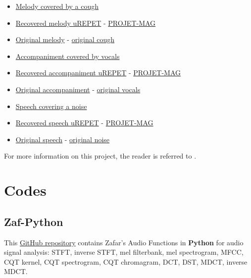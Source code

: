 \documentclass{article}
\begin{document}
\begin{itemize}[noitemsep,topsep=0pt]
\item \href{Audio/uREPET/melody&cough.wav}{Melody covered by a cough}
\item \href{Audio/uREPET/melody-cough (uREPET).wav}{Recovered melody uREPET} - \href{Audio/uREPET/melody-cough (PROJET-MAG).wav}{PROJET-MAG}
\item \href{Audio/uREPET/melody.wav}{Original melody} - \href{Audio/REPET/cough.wav}{original cough}
\end{itemize}

\begin{itemize}[noitemsep,topsep=0pt]
\item \href{Audio/uREPET/accompaniment&vocals.wav}{Accompaniment covered by vocals}
\item \href{Audio/uREPET/accompaniment-vocals (uREPET).wav}{Recovered accompaniment uREPET} - \href{Audio/uREPET/accompaniment-vocals (PROJET-MAG).wav}{PROJET-MAG}
\item \href{Audio/uREPET/accompaniment.wav}{Original accompaniment} - \href{Audio/REPET/vocals.wav}{original vocals}
\end{itemize}

\begin{itemize}[noitemsep,topsep=0pt]
\item \href{Audio/uREPET/speech&noise.wav}{Speech covering a noise}
\item \href{Audio/uREPET/speech-noise.wav (uREPET)}{Recovered speech uREPET} - \href{Audio/uREPET/speech-noise.wav (PROJET-MAG)}{PROJET-MAG}
\item \href{Audio/uREPET/speech.wav}{Original speech} - \href{Audio/REPET/noise.wav}{original noise}
\end{itemize}

For more information on this project, the reader is referred to \cite{inproceedings_fitzgerald_mar2017}.


\section{Codes}
\label{sec:codes}

\subsection{Zaf-Python}
\label{ssec:zaf-python}

This \href{https://github.com/zafarrafii/Zaf-Python}{GitHub repository} contains Zafar's Audio Functions in \textbf{Python} for audio signal analysis: STFT, inverse STFT, mel filterbank, mel spectrogram, MFCC, CQT kernel, CQT spectrogram, CQT chromagram, DCT, DST, MDCT, inverse MDCT.
\end{document}
